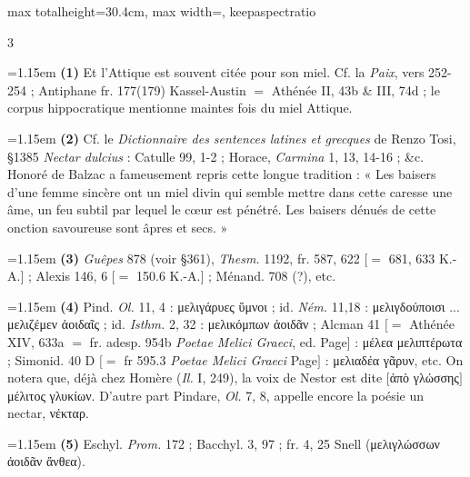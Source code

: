 \documentclass[11pt,twoside]{book}
\newcommand{\italique}[1]{\textit{#1}}
\newcommand{\latin}[1]{\textit{#1}}
\begin{document}
\begin{adjustbox}{max totalheight=30.4cm, max width=\textwidth, keepaspectratio}
\begin{minipage}{\textwidth}
{\begin{multicols}{3}
\par\vspace{1.5pt}
\par\vspace{1.2pt}\par\nopagebreak\vspace{1pt}\noindent\hangindent=1.15em {\color{sepiaNote}\textbf{(1)}} Et l'Attique est souvent citée pour son miel. Cf. la \italique{Paix}, vers 252-254 ; Antiphane fr. 177(179) Kassel-Austin $=$ Athénée II, 43b \& III, 74d ; le corpus hippocratique mentionne maintes fois du miel Attique.
\par\vspace{1.5pt}
\noindent\hangindent=1.15em {\color{sepiaNote}\textbf{(2)}} Cf. le \italique{Dictionnaire des sentences latines et grecques} de Renzo Tosi, §1385 \latin{Nectar dulcius} : Catulle 99, 1-2 ; Horace, \italique{Carmina} 1, 13, 14-16 ; \&c. Honoré de Balzac a fameusement repris cette longue tradition : « Les baisers d'une femme sincère ont un miel divin qui semble mettre dans cette caresse une âme, un feu subtil par lequel le cœur est pénétré. Les baisers dénués de cette onction savoureuse sont âpres et secs. »
\par\vspace{1.5pt}
\noindent\hangindent=1.15em {\color{sepiaNote}\textbf{(3)}} \italique{Guêpes} 878 (voir §361), \italique{Thesm.} 1192, fr. 587, 622 $[=$ 681, 633 K.-A.$]$ ; Alexis 146, 6 $[=$ 150.6 K.-A.$]$ ; Ménand. 708 (?), etc.
\par\vspace{1.5pt}
\noindent\hangindent=1.15em {\color{sepiaNote}\textbf{(4)}} Pind. \italique{Ol.} 11, 4 : μελιγάρυες ὕμνοι ; id. \italique{Ném.} 11,18 : μελιγδούποισι ... μελιζέμεν ἀοιδαῖς ; id. \italique{Isthm.} 2, 32 : μελικόμπων ἀοιδᾶν ; Alcman 41 $[=$ Athénée XIV, 633a $=$ fr. adesp. 954b \italique{Poetae Melici Graeci}, ed. Page$]$ : μέλεα μελιπτέρωτα ; Simonid. 40 D $[=$ fr 595.3 \italique{Poetae Melici Graeci} Page$]$ : μελιαδέα γᾶρυν, etc. On notera que, déjà chez Homère (\italique{Il.} I, 249), la voix de Nestor est dite $[$ἀπὸ γλώσσης$]$ μέλιτος γλυκίων. D'autre part Pindare, \italique{Ol.} 7, 8, appelle encore la poésie un nectar, νέκταρ.
\par\vspace{1.5pt}
\noindent\hangindent=1.15em {\color{sepiaNote}\textbf{(5)}} Eschyl. \italique{Prom.} 172 ; Bacchyl. 3, 97 ; fr. 4, 25 Snell (μελιγλώσσων ἀοιδᾶν ἄνθεα).

\end{multicols}}
\end{minipage}
\end{adjustbox}
\end{document}
